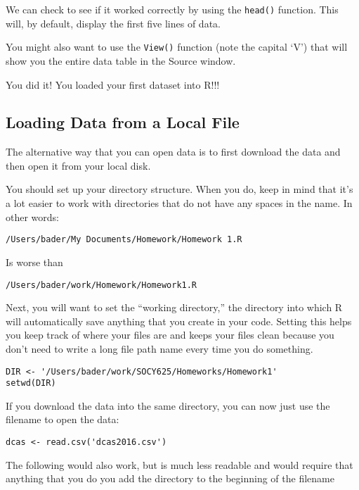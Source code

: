 \documentclass[11pt]{lecturenotes}
\newcommand{\code}[1]{\texttt{#1}}
\begin{document}
We can check to see if it worked correctly by using the \code{head()} function. This will, by default, display the first five lines of data. 

You might also want to use the \code{View()} function (note the capital `V') that will show you the entire data table in the Source window. 

You did it! You loaded your first dataset into R!!!

\subsection[10]{Loading Data from a Local File}
The alternative way that you can open data is to first download the data and then open it from your local disk. 

You should set up your directory structure. When you do, keep in mind that it's a lot easier to work with directories that do not have any spaces in the name. In other words: \slide

\parskip 0pt
\begin{verbatim}
/Users/bader/My Documents/Homework/Homework 1.R
\end{verbatim}

Is worse than 

\begin{verbatim}
/Users/bader/work/Homework/Homework1.R
\end{verbatim}

\parskip \baselineskip

Next, you will want to set the ``working directory,'' the directory into which R will automatically save anything that you create in your code. Setting this helps you keep track of where your files are and keeps your files clean because you don't need to write a long file path name every time you do something. 

\begin{verbatim}
DIR <- '/Users/bader/work/SOCY625/Homeworks/Homework1'
setwd(DIR)
\end{verbatim}
\normalsize

If you download the data into the same directory, you can now just use the filename to open the data: 

\begin{verbatim}
dcas <- read.csv('dcas2016.csv')
\end{verbatim}

The following would also work, but is much less readable and would require that anything that you do you add the directory to the beginning of the filename
\end{document}
